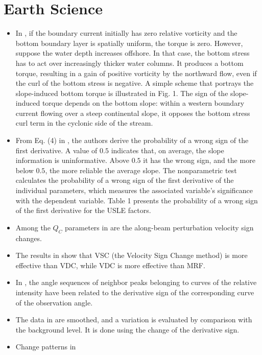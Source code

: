 \documentclass[11pt]{book}
\begin{document}
\section{Earth Science}
\begin{itemize}
\item In \cite{lee2001slope}, if the
boundary current initially has zero relative vorticity and the bottom
boundary layer is spatially uniform, the torque is zero. However,
suppose the water depth increases offshore. In that case, the bottom
stress has to act over increasingly thicker water columns. It produces
a bottom torque, resulting in a gain of positive vorticity by the
northward flow, even if the curl of the bottom stress is negative.
A simple scheme that portrays the slope-induced bottom torque is illustrated
in Fig. 1. The sign of the slope-induced torque depends on the bottom
slope: within a western boundary current flowing over a steep continental
slope, it opposes the bottom stress curl term in the cyclonic side
of the stream.
\item From Eq. (4) in \cite{sonneveld2003nonparametric},
the authors derive the probability of a wrong sign of the first derivative.
A value of $0.5$ indicates that, on average, the slope information
is uninformative. Above $0.5$ it has the wrong sign, and the more
below $0.5$, the more reliable the average slope. The nonparametric
test calculates the probability of a wrong sign of the first derivative
of the individual parameters, which measures the associated variable's
significance with the dependent variable. Table 1 presents the probability
of a wrong sign of the first derivative for the USLE factors.
\item Among the $Q_{C}$ parameters in \cite{liu2005identifying}
are the along-beam perturbation velocity sign changes.
\item The results in \cite{liu2005identifying}
show that VSC (the Velocity Sign Change method) is more effective
than VDC, while VDC is more effective than MRF.
\item In \cite{nevzorov2006glory},
the angle sequences of neighbor peaks belonging to curves of the relative
intensity have been related to the derivative sign of the corresponding
curve of the observation angle.
\item The data in \cite{parrot2011statistical}
are smoothed, and a variation is evaluated by comparison with the
background level. It is done using the change of the derivative sign.
\item Change patterns in \cite{chen2013spectral}

\end{itemize}
\end{document}
